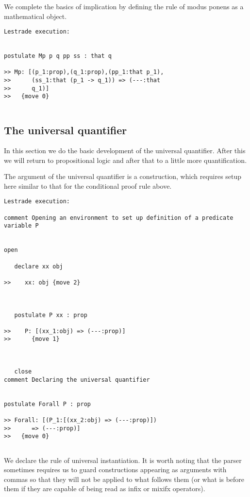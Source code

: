 \documentclass[12pt]{article}
\begin{document}
We complete the basics of implication by defining the rule of modus ponens as a mathematical object.

\begin{verbatim}Lestrade execution:


postulate Mp p q pp ss : that q

>> Mp: [(p_1:prop),(q_1:prop),(pp_1:that p_1),
>>      (ss_1:that (p_1 -> q_1)) => (---:that
>>      q_1)]
>>   {move 0}


\end{verbatim}

\subsection{The universal quantifier}

In this section we do the basic development of the universal quantifier.   After this we will return to propositional logic and after that to a little more quantification.

The argument of the universal quantifier is a construction, which requires setup here similar to that for the conditional proof rule above.

\begin{verbatim}Lestrade execution:

comment Opening an environment to set up definition of a predicate variable P


open

   declare xx obj

>>    xx: obj {move 2}



   postulate P xx : prop

>>    P: [(xx_1:obj) => (---:prop)]
>>      {move 1}



   close
comment Declaring the universal quantifier


postulate Forall P : prop

>> Forall: [(P_1:[(xx_2:obj) => (---:prop)])
>>      => (---:prop)]
>>   {move 0}


\end{verbatim}

We declare the rule of universal instantiation.  It is worth noting that the parser sometimes requires us to guard constructions appearing as arguments with commas
so that they will not be applied to what follows them (or what is before them if they are capable of being read as infix or mixifx operators).
\end{document}
